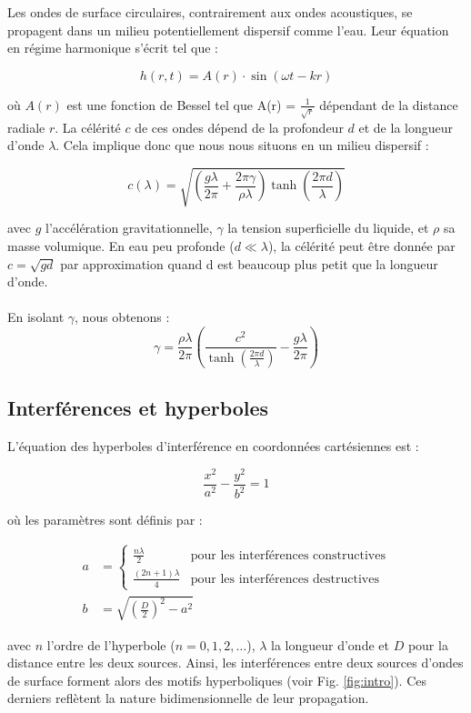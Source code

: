 Les ondes de surface circulaires, contrairement aux ondes acoustiques, se propagent dans un milieu potentiellement dispersif comme l'eau. Leur équation en régime harmonique s'écrit tel que :

\begin{equation}
    h(r,t) = A(r) \cdot \sin(\omega t - kr)
    \label{eq:onde_surface}
\end{equation}

où \(A(r)\) est une fonction de Bessel tel que A(r) = $\frac{1}{\sqrt{r}}$ dépendant de la distance radiale \(r\). La célérité \(c\) de ces ondes dépend de la profondeur \(d\) et de la longueur d'onde \(\lambda\). Cela implique donc que nous nous situons en un milieu dispersif :

\begin{equation}
    c(\lambda) = \sqrt{\left(\frac{g \lambda}{2\pi} + \frac{2\pi \gamma}{\rho \lambda}\right) \tanh\left(\frac{2\pi d}{\lambda}\right)}
    \label{eq:celerite_surface}
\end{equation}

avec \(g\) l'accélération gravitationnelle, \(\gamma\) la tension superficielle du liquide, et \(\rho\) sa masse volumique. En eau peu profonde (\(d \ll \lambda\)), la célérité peut être donnée par \(c = \sqrt{g d}\) par approximation quand d est beaucoup plus petit que la longueur d'onde.
\\\\
En isolant $\gamma$, nous obtenons :
\begin{equation}
    \gamma = \frac{\rho \lambda}{2\pi} \left( \frac{c^2}{\tanh\left(\frac{2\pi d}{\lambda}\right)} - \frac{g \lambda}{2\pi} \right)
    \label{eq:gamma_isole}
\end{equation}

\subsection{Interférences et hyperboles}
L'équation des hyperboles d'interférence en coordonnées cartésiennes est :

\begin{equation}
    \frac{x^2}{a^2} - \frac{y^2}{b^2} = 1
    \label{eq:hyper}
\end{equation}

où les paramètres sont définis par :

\begin{align}
    a &= \begin{cases}
    \frac{n\lambda}{2} & \text{pour les interférences constructives} \\
    \frac{(2n+1)\lambda}{4} & \text{pour les interférences destructives}
        \end{cases} \label{eq:a} \\
    b &= \sqrt{\left(\frac{D}{2}\right)^2 - a^2} \label{eq:b}
\end{align}

avec \(n\) l'ordre de l'hyperbole (\(n = 0, 1, 2, \ldots\)), \(\lambda\) la longueur d'onde et \(D\) pour la distance entre les deux sources. Ainsi, les interférences entre deux sources d'ondes de surface forment alors des motifs hyperboliques (voir Fig. \ref{fig:intro}). Ces derniers reflètent la nature bidimensionnelle de leur propagation.
